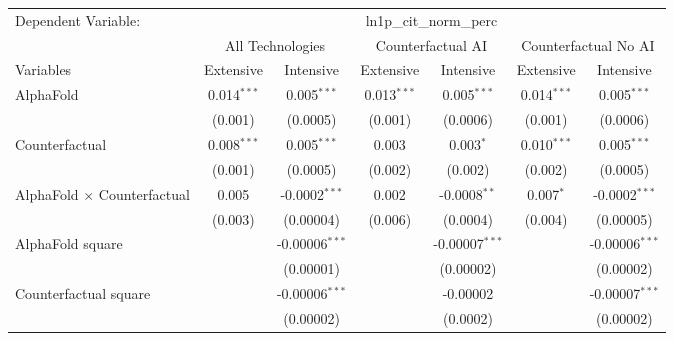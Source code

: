 \begingroup
\centering
\begin{tabular}{lcccccc}
   \tabularnewline \midrule \midrule
   Dependent Variable: & \multicolumn{6}{c}{ln1p\_cit\_norm\_perc}\\
 & \multicolumn{2}{c}{All Technologies} & \multicolumn{2}{c}{Counterfactual AI} & \multicolumn{2}{c}{Counterfactual No AI} \\
\cmidrule(lr){1-1}\cmidrule(lr){2-3} \cmidrule(lr){4-5} \cmidrule(lr){6-7}
Variables & \multicolumn{1}{c}{Extensive} & \multicolumn{1}{c}{Intensive} & \multicolumn{1}{c}{Extensive} & \multicolumn{1}{c}{Intensive} & \multicolumn{1}{c}{Extensive} & \multicolumn{1}{c}{Intensive} \\
\cmidrule(lr){1-1}\cmidrule(lr){2-2} \cmidrule(lr){3-3} \cmidrule(lr){4-4} \cmidrule(lr){5-5} \cmidrule(lr){6-6} \cmidrule(lr){7-7}
   AlphaFold                          & 0.014$^{***}$ & 0.005$^{***}$      & 0.013$^{***}$ & 0.005$^{***}$    & 0.014$^{***}$ & 0.005$^{***}$\\   
                                      & (0.001)       & (0.0005)           & (0.001)       & (0.0006)         & (0.001)       & (0.0006)\\   
   Counterfactual                     & 0.008$^{***}$ & 0.005$^{***}$      & 0.003         & 0.003$^{*}$      & 0.010$^{***}$ & 0.005$^{***}$\\   
                                      & (0.001)       & (0.0005)           & (0.002)       & (0.002)          & (0.002)       & (0.0005)\\   
   AlphaFold $\times$ Counterfactual  & 0.005         & -0.0002$^{***}$    & 0.002         & -0.0008$^{**}$   & 0.007$^{*}$   & -0.0002$^{***}$\\   
                                      & (0.003)       & (0.00004)          & (0.006)       & (0.0004)         & (0.004)       & (0.00005)\\   
   AlphaFold square                   &               & -0.00006$^{***}$   &               & -0.00007$^{***}$ &               & -0.00006$^{***}$\\   
                                      &               & (0.00001)          &               & (0.00002)        &               & (0.00002)\\   
   Counterfactual square              &               & -0.00006$^{***}$   &               & -0.00002         &               & -0.00007$^{***}$\\   
                                      &               & (0.00002)          &               & (0.0002)         &               & (0.00002)\\   

\end{tabular}
